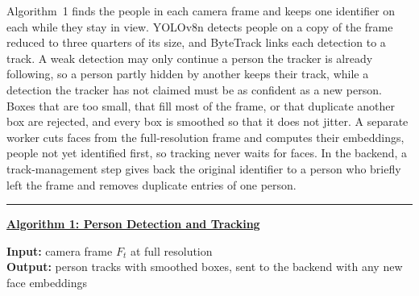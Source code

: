 \documentclass{research}
\begin{document}
Algorithm~1 finds the people in each camera frame and keeps one
identifier on each while they stay in view. YOLOv8n detects people on a
copy of the frame reduced to three quarters of its size, and ByteTrack
links each detection to a track. A weak detection may only continue a
person the tracker is already following, so a person partly hidden by
another keeps their track, while a detection the tracker has not claimed
must be as confident as a new person. Boxes that are too small, that
fill most of the frame, or that duplicate another box are rejected, and
every box is smoothed so that it does not jitter. A separate worker cuts
faces from the full-resolution frame and computes their embeddings,
people not yet identified first, so tracking never waits for faces. In
the backend, a track-management step gives back the original identifier
to a person who briefly left the frame and removes duplicate entries of
one person.

\vspace{0.5em}
\noindent\rule{\linewidth}{0.8pt}

\noindent\textbf{\underline{Algorithm 1: Person Detection and Tracking}}

\noindent\textbf{Input:} camera frame $F_t$ at full resolution\\
\noindent\textbf{Output:} person tracks with smoothed boxes, sent to the
backend with any new face embeddings
\end{document}

